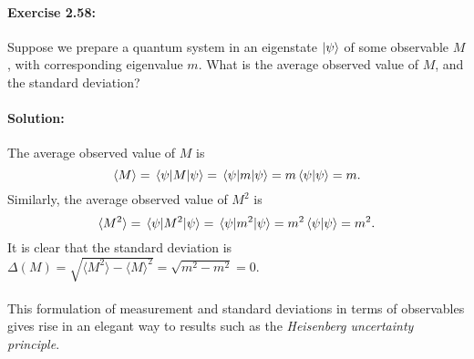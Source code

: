 \paragraph{\cite{mikeandike} Exercise 2.58:} Suppose we prepare a quantum
system in an eigenstate $\ket{\psi}$ of some observable $M$, with corresponding
eigenvalue $m$. What is the average observed value of $M$, and the standard
deviation?

\paragraph{Solution:} The average observed value of $M$ is \begin{equation*}
  \langle M \rangle = \mel{\psi}{M}{\psi} = \mel{\psi}{m}{\psi} =
    m\braket{\psi}{\psi} = m.
\end{equation*} Similarly, the average observed value of $M^2$ is
\begin{equation*}
  \langle M^2 \rangle = \mel{\psi}{M^2}{\psi} = \mel{\psi}{m^2}{\psi} =
    m^2\braket{\psi}{\psi} = m^2.
\end{equation*} It is clear that the standard deviation is $\Delta(M) = \sqrt{
  \langle M^2 \rangle - \langle M \rangle^2} = \sqrt{m^2 - m^2} = 0$.

\paragraph{} This formulation of measurement and standard deviations in terms
of observables gives rise in an elegant way to results such as the
\emph{Heisenberg uncertainty principle}.

